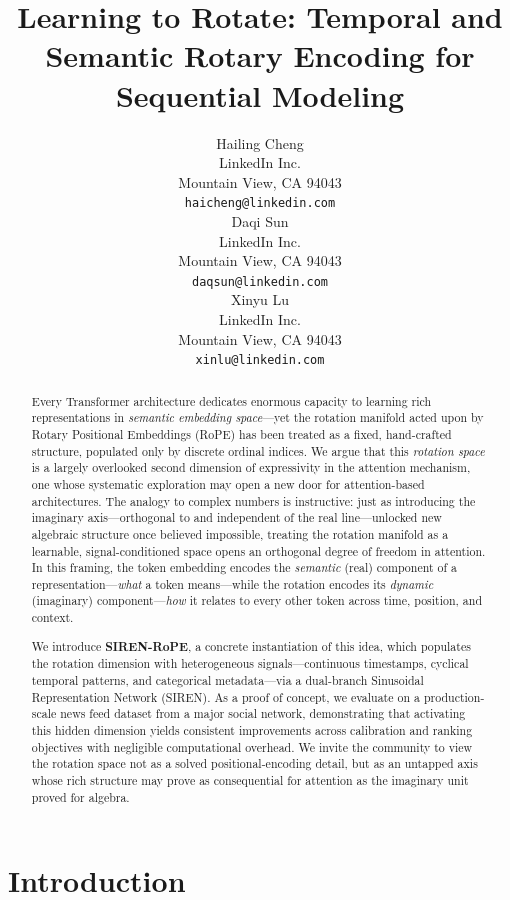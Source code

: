 \documentclass{article}
\title{Learning to Rotate: Temporal and Semantic Rotary Encoding for Sequential Modeling}
\author{%
  Hailing Cheng \\
  LinkedIn Inc.\\
  Mountain View, CA 94043 \\
  \texttt{haicheng@linkedin.com} \\
  \And
  Daqi Sun \\
  LinkedIn Inc.\\
  Mountain View, CA 94043 \\
  \texttt{daqsun@linkedin.com} \\
  \And
  Xinyu Lu \\
  LinkedIn Inc.\\
  Mountain View, CA 94043 \\
  \texttt{xinlu@linkedin.com} \\
}
\begin{document}
\maketitle

\begin{abstract}
Every Transformer architecture dedicates enormous capacity to learning rich representations in \emph{semantic embedding space}---yet the rotation manifold acted upon by Rotary Positional Embeddings (RoPE) has been treated as a fixed, hand-crafted structure, populated only by discrete ordinal indices. We argue that this \emph{rotation space} is a largely overlooked second dimension of expressivity in the attention mechanism, one whose systematic exploration may open a new door for attention-based architectures. The analogy to complex numbers is instructive: just as introducing the imaginary axis---orthogonal to and independent of the real line---unlocked new algebraic structure once believed impossible, treating the rotation manifold as a learnable, signal-conditioned space opens an orthogonal degree of freedom in attention. In this framing, the token embedding encodes the \emph{semantic} (real) component of a representation---\emph{what} a token means---while the rotation encodes its \emph{dynamic} (imaginary) component---\emph{how} it relates to every other token across time, position, and context.

We introduce \textbf{SIREN-RoPE}, a concrete instantiation of this idea, which populates the rotation dimension with heterogeneous signals---continuous timestamps, cyclical temporal patterns, and categorical metadata---via a dual-branch Sinusoidal Representation Network (SIREN). As a proof of concept, we evaluate on a production-scale news feed dataset from a major social network, demonstrating that activating this hidden dimension yields consistent improvements across calibration and ranking objectives with negligible computational overhead. We invite the community to view the rotation space not as a solved positional-encoding detail, but as an untapped axis whose rich structure may prove as consequential for attention as the imaginary unit proved for algebra.
\end{abstract}


\section{Introduction}
\label{sec:intro}
\end{document}
